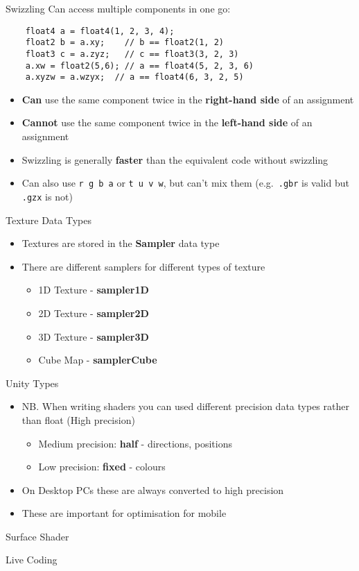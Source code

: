 \begin{frame}[fragile]{Swizzling}
	\pause Can access multiple components in one go:
	\pause\begin{lstlisting}
	float4 a = float4(1, 2, 3, 4);
	float2 b = a.xy;    // b == float2(1, 2)
	float3 c = a.zyz;   // c == float3(3, 2, 3)
	a.xw = float2(5,6); // a == float4(5, 2, 3, 6)
	a.xyzw = a.wzyx;  // a == float4(6, 3, 2, 5)
	\end{lstlisting}
	\begin{itemize}
		\pause \item\textbf{Can} use the same component twice in the \textbf{right-hand side} of an assignment 
		\pause \item\textbf{Cannot} use the same component twice in the \textbf{left-hand side} of an assignment 
		\pause \item Swizzling is generally \textbf{faster} than the equivalent code without swizzling
		\pause \item Can also use  \lstinline{r g b a} or \lstinline{t u v w}, but can't mix them
		(e.g.\ \lstinline{.gbr} is valid but \lstinline{.gzx} is not)
	\end{itemize}
\end{frame}

\begin{frame}{Texture Data Types}
	\begin{itemize}
	\pause\item Textures are stored in the \textbf{Sampler} data type
	\pause\item There are different samplers for different types of texture
	\begin{itemize}
		\pause\item 1D Texture - \textbf{sampler1D}
		\pause\item 2D Texture - \textbf{sampler2D}
		\pause\item 3D Texture - \textbf{sampler3D}
		\pause\item Cube Map - \textbf{samplerCube} 
	\end{itemize}
	\end{itemize}
\end{frame}

\begin{frame}{Unity Types}
	\begin{itemize}
		\item NB. When writing shaders you can used different precision data types rather than float (High precision)
		\begin{itemize}
			\pause\item Medium precision: \textbf{half} - directions, positions   
			\pause\item Low precision: \textbf{fixed} - colours
		\end{itemize}
		\pause\item On Desktop PCs these are always converted to high precision
		\pause\item These are important for optimisation for mobile
	\end{itemize}
\end{frame}

\begin{frame}{Surface Shader}
	\begin{center}
		Live Coding
	\end{center}
\end{frame}